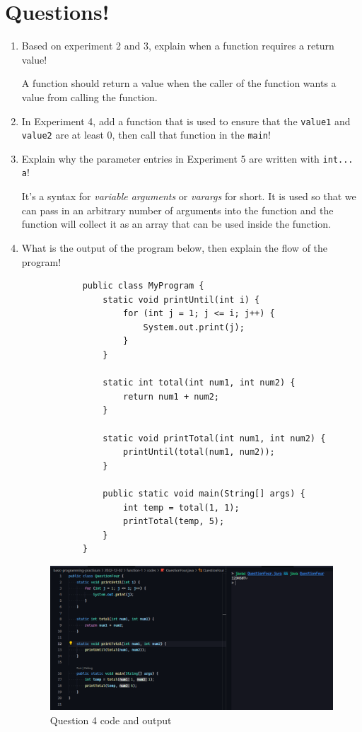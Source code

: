 \documentclass[12pt,titlepage]{article}
\begin{document}
\section{Questions!}
\begin{enumerate}
    \item {
        Based on experiment 2 and 3, explain when a function requires a return value!

        A function should return a value when the caller of the function wants a value
        from calling the function.
    }
    \item {
        In Experiment 4, add a function that is used to ensure that the \texttt{value1} and \texttt{value2}
        are at least 0, then call that function in the \texttt{main}!
    }
    \item {
        Explain why the parameter entries in Experiment 5 are written with \texttt{int... a}!

        It's a syntax for \textit{variable arguments} or \textit{varargs} for short. It is used
        so that we can pass in an arbitrary number of arguments into the function and
        the function will collect it as an array that can be used inside the function.
    }
    \item {
        What is the output of the program below, then explain the flow of the program!

        \begin{verbatim}
            public class MyProgram {
                static void printUntil(int i) {
                    for (int j = 1; j <= i; j++) {
                        System.out.print(j);
                    }
                }

                static int total(int num1, int num2) {
                    return num1 + num2;
                }

                static void printTotal(int num1, int num2) {
                    printUntil(total(num1, num2));
                }

                public static void main(String[] args) {
                    int temp = total(1, 1);
                    printTotal(temp, 5);
                }
            }
        \end{verbatim}

        \begin{figure}[h]
            \centering
            \includegraphics[width=.8\textwidth]{./images/question-four.png}
            \caption{Question 4 code and output}
        \end{figure}

}
\end{enumerate}
\end{document}
